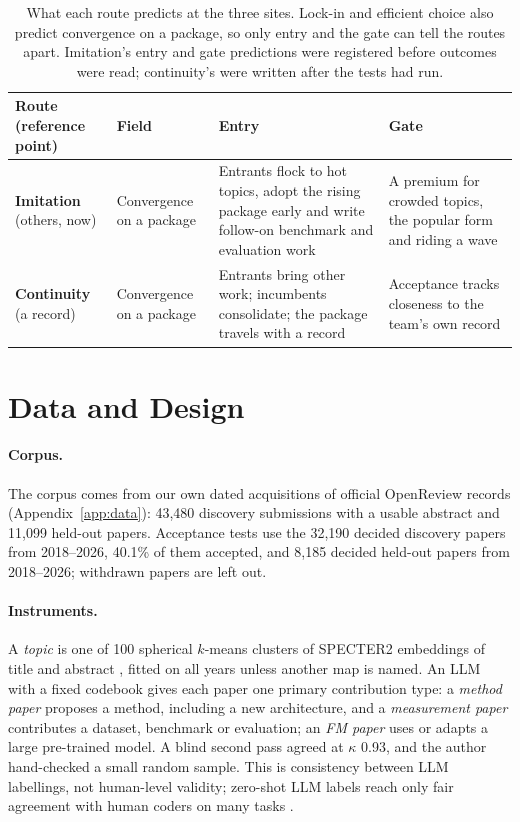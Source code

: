 \documentclass[11pt]{article}
\begin{document}
\begin{table}[t]
\centering
\scriptsize
\setlength{\tabcolsep}{2.5pt}
\renewcommand{\arraystretch}{1.1}
\begin{tabularx}{\columnwidth}{@{}L{1.3cm} L{1.25cm} Y L{1.95cm}@{}}
\toprule
Route (reference point) & Field & Entry & Gate \\
\midrule
\textbf{Imitation} (others, now) & Convergence on a package & Entrants flock to hot topics, adopt the rising package
early and write follow-on benchmark and evaluation work & A premium for crowded topics, the popular form and riding
a wave \\
\addlinespace
\textbf{Continuity} (a record) & Convergence on a package & Entrants bring other work; incumbents consolidate; the
package travels with a record & Acceptance tracks closeness to the team's own record \\
\bottomrule
\end{tabularx}
\caption{What each route predicts at the three sites. Lock-in and efficient choice also predict convergence on a
package, so only entry and the gate can tell the routes apart. Imitation's entry and gate predictions were
registered before outcomes were read; continuity's were written after the tests had run.}
\label{tab:predictions}
\end{table}

\section{Data and Design}
\label{sec:design}

\paragraph{Corpus.}
The corpus comes from our own dated acquisitions of official OpenReview records (Appendix~\ref{app:data}): 43,480
discovery submissions with a usable abstract and 11,099 held-out papers. Acceptance tests use the 32,190 decided
discovery papers from 2018--2026, 40.1\% of them accepted, and 8,185 decided held-out papers from 2018--2026; withdrawn papers are
left out.

\paragraph{Instruments.}
A \emph{topic} is one of 100 spherical $k$-means clusters of SPECTER2 embeddings of title and abstract
\citep{cohan2020specter,singh2023scirepeval}, fitted on all years unless another map is named. An LLM with a fixed
codebook gives each paper one primary contribution type: a \emph{method paper} proposes a method, including a new
architecture, and a \emph{measurement paper} contributes a dataset, benchmark or evaluation; an \emph{FM paper} uses
or adapts a large pre-trained model. A blind second pass agreed at $\kappa$ 0.93, and the author hand-checked a small
random sample.
This is consistency between LLM labellings, not human-level validity; zero-shot LLM labels reach only fair agreement
with human coders on many tasks \citep{ziems2024can}.
\end{document}
